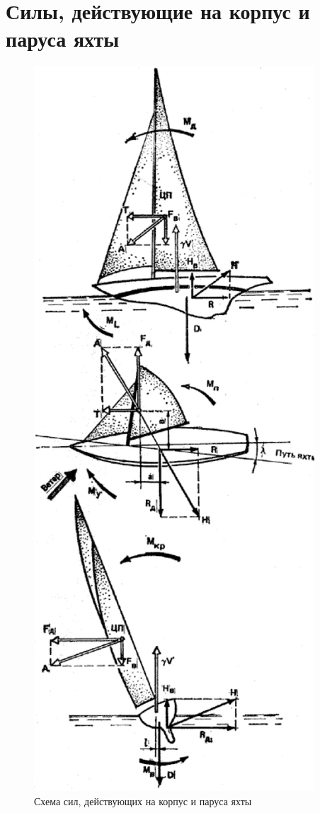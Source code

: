 \documentclass[a4paper, 12pt, twoside, final, book, russian, fittopage, cyremdash]{ncc}
\begin{document}
\section{Силы, действующие на корпус и паруса яхты}

\begin{figure}%
  \centering\includegraphics[scale=0.35]{0004_Sily_deistv_na_yakhtu.jpg}
  \caption{Схема сил, действующих на корпус и паруса яхты}
  \label{fig:4}
\end{figure}
\end{document}
